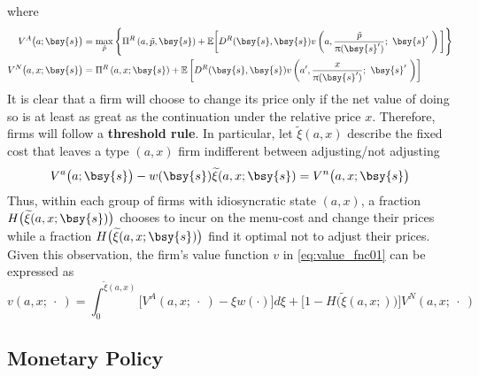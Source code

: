 \documentclass[a4paper,10pt]{article}  %
\begin{document}
where
\begin{align}
   \label{eq:value_fnc02}
   V^A\big(a;  \bsy{s}  \big) & = \max_{\tilde{p}} 
      \Bigg\{ 
         \Pi^R \left( a, \tilde{p}, \bsy{s} \right) + 
         \mathbb{E} \bigg[ D^R(\bsy{s},\bsy{s}) v\left( a, \frac{ \tilde{p} }{ \uppi(\bsy{s}') } ; \ \bsy{s}' \ \right) \bigg]
      \Bigg\} \\
   \label{eq:value_fnc03}
   V^N\big(a, x;  \bsy{s}  \big) & = 
       \Pi^R \left( a, x; \bsy{s} \right) + \mathbb{E}
       \left[ 
            D^R(\bsy{s},\bsy{s}) v\left( a', \frac{x}{ \uppi(\bsy{s}') } ; \ \bsy{s}' \  \right)
       \right]
\end{align}
It is clear that a firm will choose to change its price only if the net value of doing so is at least as great as the
continuation under the relative price $ x $. Therefore, firms will follow a \textbf{threshold rule}. In particular, let 
$ \widetilde{\xi} (a,x) $ describe the fixed cost that leaves a type $ (a,x ) $ firm indifferent between
adjusting/not adjusting
\begin{equation}
   \label{eq:threshold_policy}
   V^a\big( a ; \bsy{s} \big) - w(\bsy{s})\widetilde{\xi}(a,x; \bsy{s} ) =  V^n\big( a,x; \bsy{s} \big)
\end{equation}
Thus, within each group of firms with idiosyncratic state $ (a,x) $, a fraction $ H\big( \widetilde{\xi}(a,x; \bsy{s} ) \big) $ chooses
to incur on the menu-cost and change their prices while a fraction $ H\big( \widetilde{\xi}(a,x; \bsy{s} ) \big) $ find it optimal not
to adjust their prices. Given this observation, the firm's value function $v$ in \eqref{eq:value_fnc01} can be expressed as
\begin{equation}
   v(a, x; \ \cdot \ ) = 
      \int_0^{ \tilde{\xi}(a,x ) } 
      \Big[ 
         V^A(a, x ; \ \cdot \ ) - \xi w(\cdot) 
      \Big]d\xi  
      + \Big[  1 - H\Big( \tilde{\xi}(a, x ; ) \Big) \Big] V^N(a,x ; \ \cdot \ )
\end{equation}




\subsection{Monetary Policy} %
\label{sub:monetary_policy}
\end{document}
